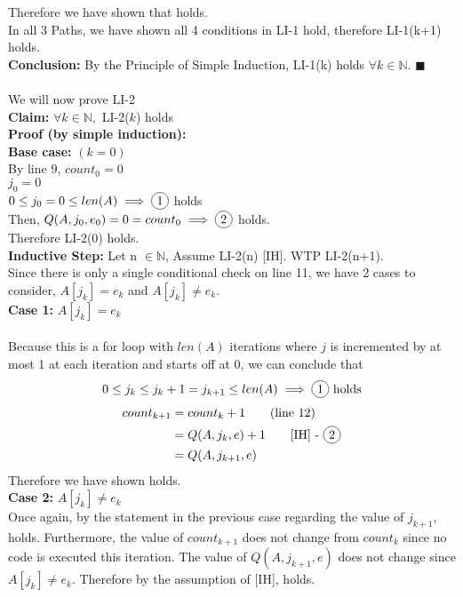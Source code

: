\documentclass{article}
\newcommand{\N}{\mathbb{N}}
\DeclareRobustCommand*\circled[1]{\tikz[baseline =(char.base)]{\node[shape=circle, draw, inner sep = 2pt] (char) {#1};}}
\begin{document}
\begin{enumerate}
	Therefore we have shown that \circled{4} holds. \\
	
	In all 3 Paths, we have shown all 4 conditions in LI-1 hold, therefore LI-1(k+1) holds. \\
	\textbf{Conclusion:} By the Principle of Simple Induction, LI-1(k) holds $\forall k \in \N$. \null\hfill $\blacksquare$ \\
	\\
	
	We will now prove LI-2 \\
	\textbf{Claim:} $\forall k \in \N,$ LI-2($k$) holds\\
	
	\textbf{Proof (by simple induction):}\\
	
	\textbf{Base case:} $(k = 0)$\\
	By line 9, $count_0 = 0$ \\
	$j_0 = 0$ \\
	$0 \leq j_0 = 0 \leq len(A) \implies \circled{1}$ holds \\
	Then, $Q(A, j_0, e_0) = 0 = count_0  \implies \circled{2}$ holds.\\
	Therefore LI-2(0) holds. \\
	
	\textbf{Inductive Step:} Let n $\in \N$, Assume LI-2(n) [IH]. WTP LI-2(n+1).\\
	Since there is only a single conditional check on line 11, we have 2 cases to consider, $A[j_k] = e_k$ and $A[j_k] \neq e_k$. \\
	
	\textbf{Case 1:} $A[j_k] = e_k$ \\\\
	Because this is a for loop with $len(A)$ iterations where $j$ is incremented by at most 1 at each iteration and starts off at 0, we can conclude that $$0 \leq j_k \leq j_k + 1 = j_{k+1} \leq len(A) \implies \circled{1}\ \textrm{holds}$$
	\begin{align*}
	count_{k+1} &= count_k + 1 \tag{line 12}\\
	&= Q(A, j_k, e) + 1 \tag*{[IH] - \circled{2}}\\
	&= Q(A, j_{k+1}, e) 
	\end{align*}
	Therefore we have shown \circled{2} holds. \\
	
	\textbf{Case 2:} $A[j_k] \neq e_k$ \\
	Once again, by the statement in the previous case regarding the value of $j_{k+1}$, \circled{1} holds. Furthermore, the value of $count_{k+1}$ does not change from $count_k$ since no code is executed this iteration. The value of $Q(A, j_{k+1}, e)$ does not change since $A[j_k] \neq e_k$. Therefore by the assumption of [IH], \circled{2} holds. 
	

\end{enumerate}
\end{document}
